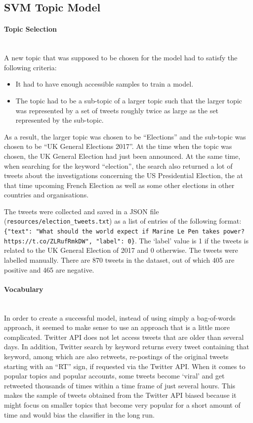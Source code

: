 \subsection{SVM Topic Model}

\paragraph{Topic Selection}\mbox{}\\
A new topic that was supposed to be chosen for the model had to satisfy the following criteria:
\begin{itemize}
    \item It had to have enough accessible samples to train a model.
    \item The topic had to be a sub-topic of a larger topic such that the larger topic was represented by a set of tweets roughly twice as large as the set represented by the sub-topic. 
\end{itemize}
As a result, the larger topic was chosen to be ``Elections'' and the sub-topic was chosen to be ``UK General Elections 2017''. At the time when the topic was chosen, the UK General Election had just been announced. At the same time, when searching for the keyword ``election'', the search also returned a lot of tweets about the investigations concerning the US Presidential Election, the at that time upcoming French Election as well as some other elections in other countries and organisations.

The tweets were collected and saved in a JSON file (\texttt{resources/election\_tweets.txt}) as a list of entries of the following format: \texttt{\{"text": "What should the world expect if Marine Le Pen takes power? https://t.co/ZLRufRmkDW", "label": 0\}}. The `label' value is 1 if the tweets is related to the UK General Election of 2017 and 0 otherwise. The tweets were labelled manually. There are 870 tweets in the dataset, out of which 405 are positive and 465 are negative.

\paragraph{Vocabulary}\mbox{}\\
In order to create a successful model, instead of using simply a bag-of-words approach, it seemed to make sense to use an approach that is a little more complicated. Twitter API does not let access tweets that are older than several days. In addition, Twitter search by keyword returns every tweet containing that keyword, among which are also retweets, re-postings of the original tweets starting with an ``RT'' sign, if requested via the Twitter API. When it comes to popular topics and popular accounts, some tweets become `viral' and get retweeted thousands of times within a time frame of just several hours. This makes the sample of tweets obtained from the Twitter API biased because it might focus on smaller topics that become very popular for a short amount of time and would bias the classifier in the long run.

